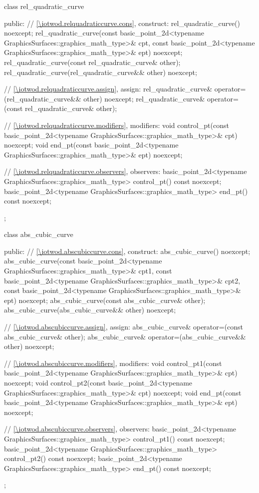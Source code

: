 \begin{codeblock}
{{    class rel_quadratic_curve {
    public:
      // \ref{\iotwod.relquadraticcurve.cons}, construct:
      rel_quadratic_curve() noexcept;
      rel_quadratic_curve(const basic_point_2d<typename
        GraphicsSurfaces::graphics_math_type>& cpt, const basic_point_2d<typename
        GraphicsSurfaces::graphics_math_type>& ept) noexcept;
      rel_quadratic_curve(const rel_quadratic_curve& other);
      rel_quadratic_curve(rel_quadratic_curve&& other) noexcept;

      // \ref{\iotwod.relquadraticcurve.assign}, assign:
      rel_quadratic_curve& operator=(rel_quadratic_curve&& other) noexcept;
      rel_quadratic_curve& operator=(const rel_quadratic_curve& other);

      // \ref{\iotwod.relquadraticcurve.modifiers}, modifiers:
      void control_pt(const basic_point_2d<typename
        GraphicsSurfaces::graphics_math_type>& cpt) noexcept;
      void end_pt(const basic_point_2d<typename
        GraphicsSurfaces::graphics_math_type>& ept) noexcept;

      // \ref{\iotwod.relquadraticcurve.observers}, observers:
      basic_point_2d<typename GraphicsSurfaces::graphics_math_type> control_pt() const noexcept;
      basic_point_2d<typename GraphicsSurfaces::graphics_math_type> end_pt() const noexcept;
    };

    class abs_cubic_curve {
    public:
      // \ref{\iotwod.abscubiccurve.cons}, construct:
      abs_cubic_curve() noexcept;
      abs_cubic_curve(const basic_point_2d<typename GraphicsSurfaces::graphics_math_type>& cpt1,
        const basic_point_2d<typename GraphicsSurfaces::graphics_math_type>& cpt2,
        const basic_point_2d<typename GraphicsSurfaces::graphics_math_type>& ept) noexcept;
      abs_cubic_curve(const abs_cubic_curve& other);
      abs_cubic_curve(abs_cubic_curve&& other) noexcept;

      // \ref{\iotwod.abscubiccurve.assign}, assign:
      abs_cubic_curve& operator=(const abs_cubic_curve& other);
      abs_cubic_curve& operator=(abs_cubic_curve&& other) noexcept;

      // \ref{\iotwod.abscubiccurve.modifiers}, modifiers:
      void control_pt1(const basic_point_2d<typename
        GraphicsSurfaces::graphics_math_type>& cpt) noexcept;
      void control_pt2(const basic_point_2d<typename
        GraphicsSurfaces::graphics_math_type>& cpt) noexcept;
      void end_pt(const basic_point_2d<typename
        GraphicsSurfaces::graphics_math_type>& ept) noexcept;

      // \ref{\iotwod.abscubiccurve.observers}, observers:
      basic_point_2d<typename GraphicsSurfaces::graphics_math_type> control_pt1() const noexcept;
      basic_point_2d<typename GraphicsSurfaces::graphics_math_type> control_pt2() const noexcept;
      basic_point_2d<typename GraphicsSurfaces::graphics_math_type> end_pt() const noexcept;
    };

}}
\end{codeblock}
